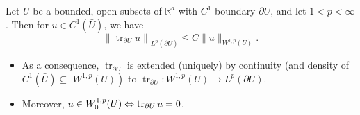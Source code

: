 \begin{theorem}
Let $U$ be a bounded, open subsets of $\mathbb{R}^{d}$ with $C^{1}$ boundary $\partial U$, and let $1<p<\infty$. Then for $u \in C^{1}(\bar{U})$, we have
$$
\left\|\operatorname{tr}_{\partial U} u\right\|_{L^{p}(\partial U)} \leq C\|u\|_{W^{1, p}(U)} .
$$
\begin{itemize}
    \item As a consequence, $\operatorname{tr}_{\partial U}$ is extended (uniquely) by continuity (and density of $C^{1}(\bar{U}) \subseteq$ $\left.W^{1, p}(U)\right)$ to $\operatorname{tr}_{\partial U}: W^{1, p}(U) \rightarrow L^{p}(\partial U) .$
    \item Moreover, $u\in W_0^{1,p}(U) \Leftrightarrow \mathop{\mathrm{tr}}_{\partial U} u = 0$. 
\end{itemize}
\end{theorem}
